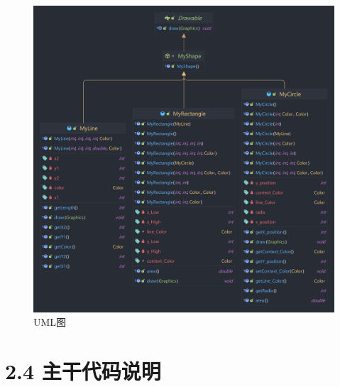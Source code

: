 \begin{figure}[H]
	\centering
	\includegraphics[width = 1\textwidth]{../pic/2/2.3.3.png}
	\caption{UML图}
\end{figure}

\section{2.4 主干代码说明}

